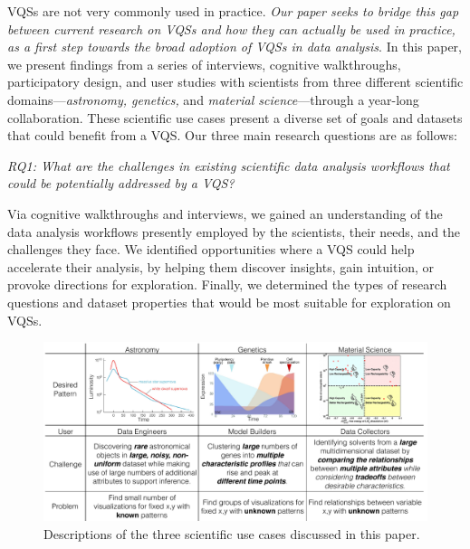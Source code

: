 VQSs are not very commonly used in practice.
{\em Our paper seeks to bridge this gap between current research on VQSs  and how they can actually be used in practice, as a first step towards the broad adoption of VQSs in data analysis}. 
In this paper, we present findings from a series of interviews, cognitive walkthroughs, participatory design, and user studies with scientists from three different scientific 
domains---{\em astronomy, genetics,} and {\em material science}---through a year-long collaboration.
These scientific use cases present a diverse set of goals and datasets that could benefit from a VQS. Our three main research questions are as follows:

\noindent \emph{RQ1: What are the challenges in existing scientific data analysis workflows that could be potentially addressed by a VQS?}
\par Via cognitive walkthroughs and interviews,
we gained an understanding of the data analysis 
workflows presently employed by the scientists, their needs,
and the challenges they face. 
We identified opportunities where a VQS could
help accelerate their analysis, by helping them
discover insights, gain intuition, or provoke directions
for exploration. Finally, we determined the types of 
research questions and dataset properties that would
be most suitable for exploration on VQSs.
\begin{figure}[ht!]
\centering
\vspace{-15pt}
\includegraphics[width=0.8\linewidth]{figures/sci_challenge_tbl.pdf}
\vspace{-6pt}\caption{Descriptions of the three scientific use cases discussed in this paper.}
\label{example}
\vspace{-10pt}
\end{figure}

